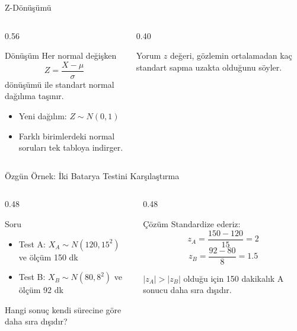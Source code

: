 \documentclass[light]{lutbeamer}
\begin{document}
\begin{frame}{Z-Dönüşümü}
\small
\begin{columns}[T,onlytextwidth]
    \begin{column}{0.56\textwidth}
        \begin{block}{Dönüşüm}
            Her normal değişken
            \[
            Z=\frac{X-\mu}{\sigma}
            \]
            dönüşümü ile standart normal dağılıma taşınır.
        \end{block}

        \begin{itemize}
            \item Yeni dağılım: $Z \sim N(0,1)$
            \item Farklı birimlerdeki normal soruları tek tabloya indirger.
        \end{itemize}
    \end{column}
    \begin{column}{0.40\textwidth}
        \begin{exampleblock}{Yorum}
            $z$ değeri, gözlemin ortalamadan kaç standart sapma uzakta olduğunu söyler.
        \end{exampleblock}
    \end{column}
\end{columns}
\end{frame}

\begin{frame}{Özgün Örnek: İki Batarya Testini Karşılaştırma}
\small
\begin{columns}[T,onlytextwidth]
    \begin{column}{0.48\textwidth}
        \begin{block}{Soru}
            \begin{itemize}
                \item Test A: $X_A \sim N(120,15^2)$ ve ölçüm 150 dk
                \item Test B: $X_B \sim N(80,8^2)$ ve ölçüm 92 dk
            \end{itemize}

            Hangi sonuç kendi sürecine göre daha sıra dışıdır?
        \end{block}
    \end{column}
    \begin{column}{0.48\textwidth}
        \begin{exampleblock}{Çözüm}
            Standardize ederiz:
            \[
            z_A=\frac{150-120}{15}=2
            \]
            \[
            z_B=\frac{92-80}{8}=1.5
            \]

            \vspace{0.15cm}
            $|z_A|>|z_B|$ olduğu için 150 dakikalık A sonucu daha sıra dışıdır.
        \end{exampleblock}
    \end{column}
\end{columns}
\end{frame}
\end{document}
